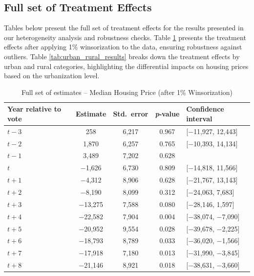 \subsection{Full set of Treatment Effects}


Tables below present the full set of treatment effects for the results presented in our heterogeneity analysis and robustness checks. Table \ref{tab:median_sale_amount_winsorized} presents the treatment effects after applying 1\% winsorization to the data, ensuring robustness against outliers. Table \ref{tab:urban_rural_results} breaks down the treatment effects by urban and rural categories, highlighting the differential impacts on housing prices based on the urbanization level.
\begin{table}[htbp]
    \centering
    \caption{Full set of estimates – Median Housing Price (after 1\% Winsorization)}
    \label{tab:median_sale_amount_winsorized}
    \begin{threeparttable}
    \begin{minipage}{\linewidth}
    \centering
    \begin{tabular}{p{3cm}cccl}
        \hline
        \textbf{Year relative to vote} & \textbf{Estimate} & \textbf{Std.~error} & \textbf{\textit{p}‐value} & \textbf{Confidence interval} \\
        \hline
        $t - 3$  & 258    & 6,217  & 0.967 & [$-$11,927, 12,443] \\
        $t - 2$  & 1,870  & 6,257  & 0.765 & [$-$10,393, 14,134] \\
        $t - 1$  & 3,489  & 7,202  & 0.628 & \\
        $t$      & $-$1,626 & 6,730  & 0.809 & [$-$14,818, 11,566] \\
        $t + 1$  & $-$4,312 & 8,906  & 0.628 & [$-$21,767, 13,143] \\
        $t + 2$  & $-$8,190 & 8,099  & 0.312 & [$-$24,063, 7,683] \\
        $t + 3$  & $-$13,275 & 7,588  & 0.080 & [$-$28,146, 1,597] \\
        $t + 4$  & $-$22,582 & 7,904  & 0.004 & [$-$38,074, $-$7,090] \\
        $t + 5$  & $-$20,952 & 9,554  & 0.028 & [$-$39,678, $-$2,225] \\
        $t + 6$  & $-$18,793 & 8,789  & 0.033 & [$-$36,020, $-$1,566] \\
        $t + 7$  & $-$17,918 & 7,180  & 0.013 & [$-$31,990, $-$3,845] \\
        $t + 8$  & $-$21,146 & 8,921  & 0.018 & [$-$38,631, $-$3,660] \\

\end{tabular}
\end{minipage}
\end{threeparttable}
\end{table}
